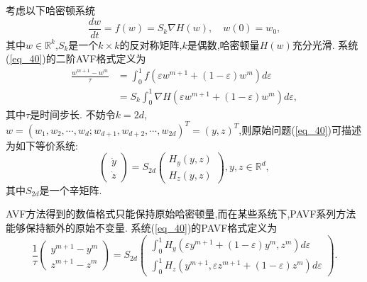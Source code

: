 考虑以下哈密顿系统
\begin{equation}
\frac{d w}{d t}=f(w)=S_{k} \nabla H(w), \quad w(0)=w_{0},
\label{eq_40}\end{equation}
其中$w \in \mathbb{R}^{k}$,$S_{k}$是一个$k \times k$的反对称矩阵,$k$是偶数,哈密顿量$H(w)$充分光滑.
系统(\ref{eq_40})的二阶AVF格式定义为
\begin{equation}
\begin{aligned}
\frac{w^{m+1}-w^{m}}{\tau} &=\int_{0}^{1} f\left(\varepsilon w^{m+1}+(1-\varepsilon) w^{m}\right) d \varepsilon \\
&=S_{k} \int_{0}^{1} \nabla H\left(\varepsilon w^{m+1}+(1-\varepsilon) w^{m}\right) d \varepsilon,
\end{aligned}
\label{eq_41}\end{equation}
其中$\tau$是时间步长.
不妨令$k=2d$,$w=\left(w_{1}, w_{2}, \cdots, w_{d} ; w_{d+1}, w_{d+2}, \cdots, w_{2d}\right)^{T}=(y, z)^{T}$,则原始问题(\ref{eq_40})可描述为如下等价系统:
\begin{equation}
\left(\begin{array}{l}
\dot{y} \\
\dot{z}
\end{array}\right)=S_{2 d}\left(\begin{array}{c}
H_{y}(y, z) \\
H_{z}(y, z)
\end{array}\right), y, z \in \mathbb{R}^{d},
\label{eq_42}\end{equation}
其中$S_{2 d}$是一个辛矩阵.

AVF方法得到的数值格式只能保持原始哈密顿量,而在某些系统下,PAVF系列方法能够保持额外的原始不变量.
系统(\ref{eq_40})的PAVF格式定义为
\begin{equation}
\frac{1}{\tau}\left(\begin{array}{c}
y^{m+1}-y^{m} \\
z^{m+1}-z^{m}
\end{array}\right)=S_{2 d}\left(\begin{array}{c}
\int_{0}^{1} H_{y}\left(\varepsilon y^{m+1}+(1-\varepsilon) y^{m}, z^{m}\right) d \varepsilon \\
\int_{0}^{1} H_{z}\left(y^{m+1}, \varepsilon z^{m+1}+(1-\varepsilon) z^{m}\right) d \varepsilon
\end{array}\right) .
\label{eq_43}\end{equation}

